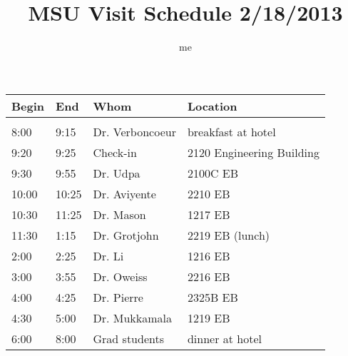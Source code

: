 \documentclass{article}
\author{me}
\title{MSU Visit Schedule 2/18/2013}
\begin{document}
\begin{tabular}{l l l l}
Begin &  End  & Whom            & Location\\
\hline\\
 8:00 &  9:15 & Dr. Verboncoeur & breakfast at hotel\\
 9:20 &  9:25 & Check-in        & 2120  Engineering Building\\
 9:30 &  9:55 & Dr. Udpa        & 2100C EB\\
10:00 & 10:25 & Dr. Aviyente    & 2210  EB\\
10:30 & 11:25 & Dr. Mason       & 1217  EB\\
11:30 &  1:15 & Dr. Grotjohn    & 2219  EB (lunch)\\
 2:00 &  2:25 & Dr. Li          & 1216  EB\\
 3:00 &  3:55 & Dr. Oweiss      & 2216  EB\\
 4:00 &  4:25 & Dr. Pierre      & 2325B EB\\
 4:30 &  5:00 & Dr. Mukkamala   & 1219  EB\\
 6:00 &  8:00 & Grad students   & dinner at hotel\\
\end{tabular}
\end{document}
